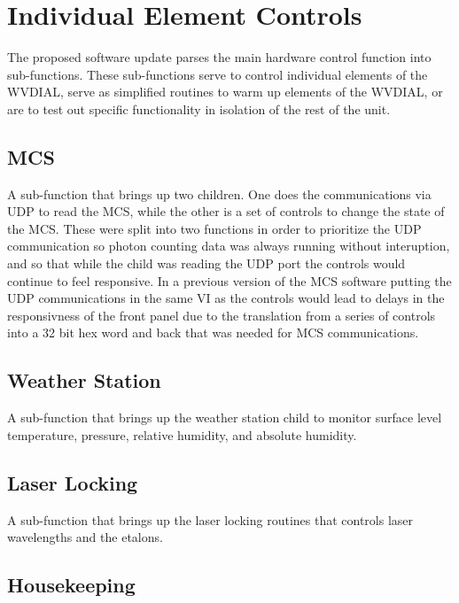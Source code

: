 \section{Individual Element Controls}
The proposed software update parses the main hardware control function into sub-functions. These sub-functions serve to control individual elements of the WVDIAL, serve as simplified routines to warm up elements of the WVDIAL, or are to test out specific functionality in isolation of the rest of the unit. 

\subsection{MCS}\label{Sec:MCSSubFunction}

A sub-function that brings up two children. One does the communications via UDP to read the MCS, while the other is a set of controls to change the state of the MCS. These were split into two functions in order to prioritize the UDP communication so photon counting data was always running without interuption, and so that while the child was reading the UDP port the controls would continue to feel responsive. In a previous version of the MCS software putting the UDP communications in the same VI as the controls would lead to delays in the responsivness of the front panel due to the translation from a series of controls into a 32 bit hex word and back that was needed for MCS communications. 

\subsection{Weather Station}\label{Sec:WSSubFunction}

A sub-function that brings up the weather station child to monitor surface level temperature, pressure, relative humidity, and absolute humidity. 

\subsection{Laser Locking}\label{Sec:LLSubFunction}

A sub-function that brings up the laser locking routines that controls laser wavelengths and the etalons. 

\subsection{Housekeeping}\label{Sec:HousekeepingSubFunction}

